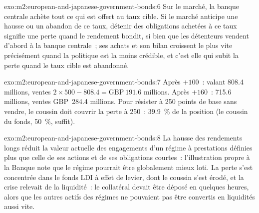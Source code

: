 \begin{solution}{exo:m2:european-and-japanese-government-bonds:6}
Sur le marché, la banque centrale achète tout ce qui est offert au taux cible. Si le
marché anticipe une hausse ou un abandon de ce taux, détenir des obligations achetées à ce taux
signifie une perte quand le rendement bondit, si bien que les détenteurs vendent d'abord à la
banque centrale~; ses achats et son bilan croissent le plus vite précisément quand la
politique est la moins crédible, et c'est elle qui subit la perte quand le taux cible est abandonné.
\end{solution}

\begin{solution}{exo:m2:european-and-japanese-government-bonds:7}
Après $+100$~:  valant 808.4 millions, ventes $2 \times 500 - 808.4 =
\text{GBP}~191.6$ millions. Après $+160$~:  715.6 millions, ventes GBP~284.4
millions. Pour résister à 250 points de base sans vendre, le coussin doit couvrir
la perte à 250~: 39.9~\% de la position (le coussin du fonds, 50~\%, suffit).
\end{solution}

\begin{solution}{exo:m2:european-and-japanese-government-bonds:8}
La hausse des rendements longs réduit la valeur actuelle des engagements d'un régime à prestations définies
plus que celle de ses actions et de ses obligations courtes~: l'illustration propre à la Banque
note que le régime pourrait être globalement mieux loti. La perte
s'est concentrée dans le fonds LDI à effet de levier, dont le coussin s'est érodé, et la
crise relevait de la liquidité~: le collatéral devait être déposé en quelques heures, alors que les
autres actifs des régimes ne pouvaient pas être convertis en liquidités aussi vite.
\end{solution}

